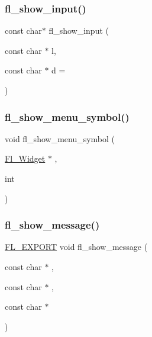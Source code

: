 \mbox{\label{forms_8_h_a0714ed98c5863c021c6bc592dd82f7e0}} 
\subsubsection{\texorpdfstring{fl\+\_\+show\+\_\+input()}{fl\_show\_input()}}
{\footnotesize\ttfamily const char$\ast$ fl\+\_\+show\+\_\+input (\begin{DoxyParamCaption}\item[{const char $\ast$}]{l,  }\item[{const char $\ast$}]{d = {} }\end{DoxyParamCaption})\hspace{0.3cm}{\ttfamily [inline]}}

\mbox{\label{forms_8_h_a84ae74611bf1b6a0fde7a1d1b27e5406}} 
\subsubsection{\texorpdfstring{fl\+\_\+show\+\_\+menu\+\_\+symbol()}{fl\_show\_menu\_symbol()}}
{\footnotesize\ttfamily void fl\+\_\+show\+\_\+menu\+\_\+symbol (\begin{DoxyParamCaption}\item[{\hyperlink{class_fl___widget}{Fl\+\_\+\+Widget} $\ast$}]{,  }\item[{int}]{ }\end{DoxyParamCaption})\hspace{0.3cm}{\ttfamily [inline]}}

\mbox{\label{forms_8_h_a4be3d378cdb6fe80150fcec2f47ed0b3}} 
\subsubsection{\texorpdfstring{fl\+\_\+show\+\_\+message()}{fl\_show\_message()}}
{\footnotesize\ttfamily \hyperlink{_fl___export_8_h_aa9ba29a18aee9d738370a06eeb4470fc}{F\+L\+\_\+\+E\+X\+P\+O\+RT} void fl\+\_\+show\+\_\+message (\begin{DoxyParamCaption}\item[{const char $\ast$}]{,  }\item[{const char $\ast$}]{,  }\item[{const char $\ast$}]{ }\end{DoxyParamCaption})}

